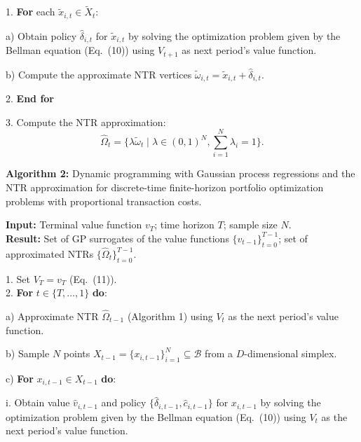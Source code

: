 \documentclass[10pt,a4paper]{article}
\numberwithin{equation}{section} %
\begin{document}
\vspace{0.5cm}

1. \textbf{For} each $\tilde{x}_{i,t} \in \tilde{X}_t$:

\hspace{0.5cm} a) Obtain policy $\hat{\delta}_{i,t}$ for $\tilde{x}_{i,t}$ by solving the optimization problem given by the Bellman equation (Eq.~(10)) using $V_{t+1}$ as next period's value function.

\hspace{0.5cm} b) Compute the approximate NTR vertices $\tilde{\omega}_{i,t} = \tilde{x}_{i,t} + \hat{\delta}_{i,t}$.

2. \textbf{End for}

\vspace{0.5cm}

3. Compute the NTR approximation: 
\[
\hat{\Omega}_t = \{\lambda \tilde{\omega}_t \mid \lambda \in (0,1)^N, \sum_{i=1}^{N} \lambda_i = 1\}.
\]


\textbf{Algorithm 2:} Dynamic programming with Gaussian process regressions and the NTR approximation for discrete-time finite-horizon portfolio optimization problems with proportional transaction costs.

\vspace{0.5cm}

\textbf{Input:} Terminal value function $v_T$; time horizon $T$; sample size $N$. \\
\textbf{Result:} Set of GP surrogates of the value functions $\{v_{t-1}\}_{t=0}^{T-1}$; set of approximated NTRs $\{\hat{\Omega}_t\}_{t=0}^{T-1}$.

\vspace{0.5cm}

1. Set $V_T = v_T$ (Eq.~(11)). \\
2. \textbf{For} $t \in \{T, \dots, 1\}$ \textbf{do}:

\hspace{0.5cm} a) Approximate NTR $\hat{\Omega}_{t-1}$ (Algorithm 1) using $V_t$ as the next period's value function.

\hspace{0.5cm} b) Sample $N$ points $X_{t-1} = \{x_{i,t-1}\}_{i=1}^{N} \subseteq \mathcal{B}$ from a $D$-dimensional simplex.

\hspace{0.5cm} c) \textbf{For} $x_{i,t-1} \in X_{t-1}$ \textbf{do}:

\hspace{1cm} i. Obtain value $\hat{v}_{i,t-1}$ and policy $\{\hat{\delta}_{i,t-1}, \hat{c}_{i,t-1}\}$ for $x_{i,t-1}$ by solving the optimization problem given by the Bellman equation (Eq.~(10)) using $V_t$ as the next period's value function.
\end{document}
